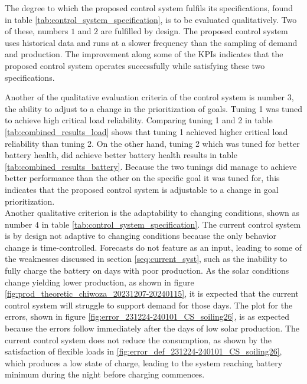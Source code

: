 The degree to which the proposed control system fulfils its specifications, found in table \ref{tab:control_system_specification}, is to be evaluated qualitatively. Two of these, numbers $1$ and $2$ are fulfilled by design. The proposed control system uses historical data and runs at a slower frequency than the sampling of demand and production. The improvement along some of the KPIs indicates that the proposed control system operates successfully while satisfying these two specifications.

Another of the qualitative evaluation criteria of the control system is number $3$, the ability to adjust to a change in the prioritization of goals. Tuning 1 was tuned to achieve high critical load reliability. Comparing tuning 1 and 2 in table \ref{tab:combined_results_load} shows that tuning 1 achieved higher critical load reliability than tuning 2. On the other hand, tuning 2 which was tuned for better battery health, did achieve better battery health results in table \ref{tab:combined_results_battery}. Because the two tunings did manage to achieve better performance than the other on the specific goal it was tuned for, this indicates that the proposed control system is adjustable to a change in goal prioritization. \\

Another qualitative criterion is the adaptability to changing conditions, shown as number $4$ in table \ref{tab:control_system_specification}. The current control system is by design not adaptive to changing conditions because the only behavior change is time-controlled. Forecasts do not feature as an input, leading to some of the weaknesses discussed in section \ref{seq:current_syst}, such as the inability to fully charge the battery on days with poor production. As the solar conditions  change yielding lower production, as shown in figure \ref{fig:prod_theoretic_chiwoza_20231207-20240115}, it is expected that the current control system will struggle to support demand for those days. The plot for the errors, shown in figure \ref{fig:error_231224-240101_CS_soiling26}, is as expected because the errors follow immediately after the days of low solar production. The current control system does not reduce the consumption, as shown by the satisfaction of flexible loads in \ref{fig:error_def_231224-240101_CS_soiling26}, which produces a low state of charge, leading to the system reaching battery minimum during the night before charging commences.

